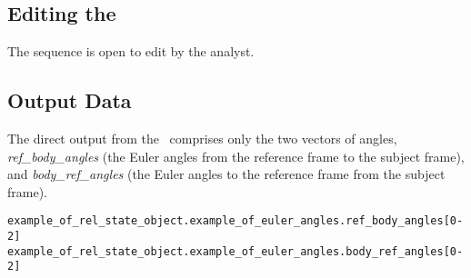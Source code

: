 \subsection{Editing the \EulerDescT}
The sequence is open to edit by the analyst.

\subsection{Output Data}
The direct output from the \EulerDesc\ comprises only the two vectors of angles,
\textit{ref\_body\_angles} (the Euler angles from the reference frame to the subject frame), and
\textit{body\_ref\_angles} (the Euler angles to the reference frame from the subject frame).
\begin{verbatim}
example_of_rel_state_object.example_of_euler_angles.ref_body_angles[0-2]
example_of_rel_state_object.example_of_euler_angles.body_ref_angles[0-2]
\end{verbatim}



